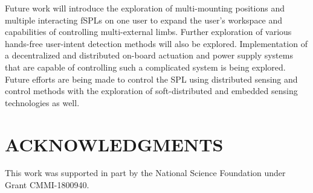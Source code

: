 \documentclass[letterpaper, 10 pt, conference]{ieeeconf}  %
\begin{document}
Future work will introduce the exploration of multi-mounting positions and multiple interacting fSPLs on one user to expand the user’s workspace and capabilities of controlling multi-external limbs. Further exploration of various hands-free user-intent detection methods will also be explored. Implementation of a decentralized and distributed on-board actuation and power supply systems that are capable of controlling such a complicated system is being explored. Future efforts are being made to control the SPL using distributed sensing and control methods \cite{Wenlong2018} with the exploration of soft-distributed and embedded sensing technologies as well. 
% 
% 






\section*{ACKNOWLEDGMENTS} 
This work was supported in part by the National Science Foundation under Grant CMMI-1800940.







%
\end{document}
